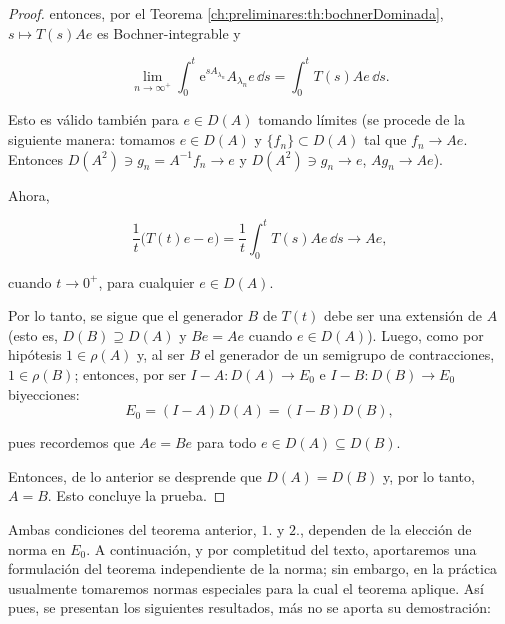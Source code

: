 \begin{proof}
    entonces, por el Teorema \ref{ch:preliminares:th:bochnerDominada}, $s \mapsto T(s)Ae$ es Bochner-integrable y

    \[\lim_{n \rightarrow \infty^+}\int_0^t \mathrm{e}^{sA_{\lambda_n}}A_{\lambda_n}e \, \dd s = \int_0^t T(s)Ae \, \dd s.\]

    Esto es válido también para $e \in D(A)$ tomando límites (se procede de la siguiente manera: tomamos $e \in D(A)$ y $\{f_n\} \subset D(A)$ tal que $f_n \rightarrow Ae$. Entonces $D(A^2) \ni g_n = A^{-1}f_n \rightarrow e$ y $D(A^2) \ni g_n \rightarrow e$, $Ag_n \rightarrow Ae$).

    Ahora,

    \[\frac{1}{t}\big(T(t)e - e\big) = \frac{1}{t}\int_0^t T(s) Ae \, \dd s \rightarrow Ae,\]

    cuando $t \rightarrow 0^+$, para cualquier $e \in D(A)$.

    Por lo tanto, se sigue que el generador $B$ de $T(t)$ debe ser una extensión de $A$ (esto es, $D(B) \supseteq D(A)$ y $Be = Ae$ cuando $e \in D(A)$). Luego, como por hipótesis $1 \in \rho(A)$ y, al ser $B$ el generador de un semigrupo de contracciones\footnotemark, $1 \in \rho(B)$; entonces, por ser $I - A: D(A) \rightarrow E_0$ e $I - B: D(B) \rightarrow E_0$ biyecciones:
    \[E_0 = (I-A)D(A) = (I - B)D(B),\]

    pues recordemos que $Ae = Be$ para todo $e \in D(A) \subseteq D(B)$.

    Entonces, de lo anterior se desprende que $D(A) = D(B)$ y, por lo tanto, $A = B$. Esto concluye la prueba.
\end{proof}

Ambas condiciones del teorema anterior, $1.$ y $2.$, dependen de la elección de norma en $E_0$. A continuación, y por completitud del texto, aportaremos una formulación del teorema independiente de la norma; sin embargo, en la práctica usualmente tomaremos normas especiales para la cual el teorema aplique. Así pues, se presentan los siguientes resultados, más no se aporta su demostración:\\

